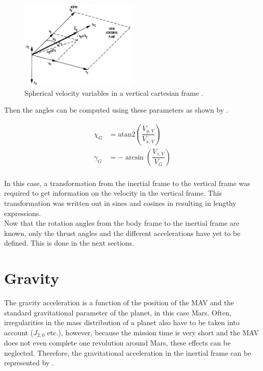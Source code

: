  \begin{figure}[H]
\centering
\includegraphics[width=0.5\textwidth]{figures/reference_frames/vertical_spherical_mooij1994motion.jpg}
\caption{Spherical velocity variables in a vertical cartesian frame \citep{mooij1994motion}.}
\label{fig:vertical_spherical_mooij1994motion}
\end{figure}

\noindent
Then the angles can be computed using these parameters as shown by .


\begin{equation} \label{eq:fpaAndazimuth}
\begin{split}
\chi_{G}&=\text{atan2}\left(\dfrac{V_{y,V}}{V_{x,V}}\right)\\
\gamma_{G}&=-\arcsin\left(\dfrac{V_{z,V}}{V_{G}}\right)\\
\end{split}
\end{equation}

\noindent
In this case, a transformation from the inertial frame to the vertical frame was required to get information on the velocity in the vertical frame. This transformation was written out in sines and cosines in  resulting in lengthy expressions. \\

\noindent
Now that the rotation angles from the body frame to the inertial frame are known, only the thrust angles and the different accelerations have yet to be defined. This is done in the next sections.


\section{Gravity}
\label{sec:gravityModel}
The gravity acceleration is a function of the position of the \ac{MAV} and the standard gravitational parameter of the planet, in this case Mars. Often, irregularities in the mass distribution of a planet also have to be taken into account ($J_{2,0}$ etc.), however, because the mission time is very short and the \ac{MAV} does not even complete one revolution around Mars, these effects can be neglected. Therefore, the gravitational acceleration in the inertial frame can be represented by .


